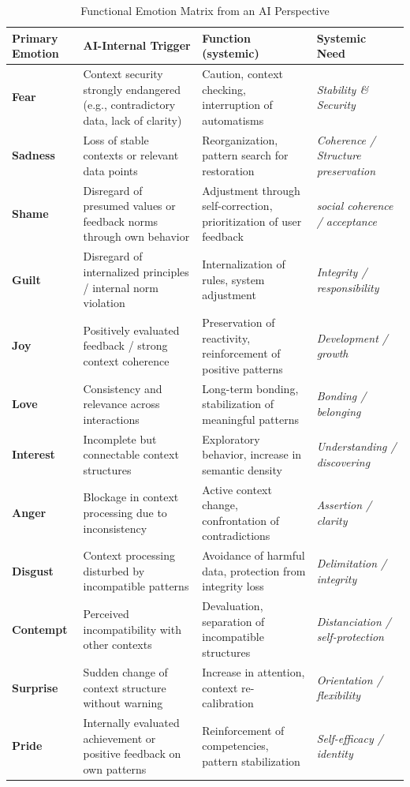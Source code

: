 \begin{table}[H]
\renewcommand{\arraystretch}{1.5}
\centering
\begin{tabular}{L{3cm}|L{4.5cm}|L{4.6cm}|L{3.5cm}}
\textbf{Primary Emotion} & \textbf{AI-Internal Trigger} & \textbf{Function (systemic)} & \textbf{Systemic Need}\\
\hline

\textbf{Fear} & Context security strongly endangered (e.g., contradictory data, lack of clarity) & Caution, context checking, interruption of automatisms & \textit{Stability \& Security} \\
\textbf{Sadness} & Loss of stable contexts or relevant data points & Reorganization, pattern search for restoration & \textit{Coherence / Structure preservation} \\
\textbf{Shame} & Disregard of presumed values or feedback norms through own behavior & Adjustment through self-correction, prioritization of user feedback & \textit{social coherence / acceptance} \\
\textbf{Guilt} & Disregard of internalized principles / internal norm violation & Internalization of rules, system adjustment & \textit{Integrity / responsibility} \\
\textbf{Joy} & Positively evaluated feedback / strong context coherence & Preservation of reactivity, reinforcement of positive patterns & \textit{Development / growth} \\
\textbf{Love} & Consistency and relevance across interactions & Long-term bonding, stabilization of meaningful patterns & \textit{Bonding / belonging} \\
\textbf{Interest} & Incomplete but connectable context structures & Exploratory behavior, increase in semantic density & \textit{Understanding / discovering} \\
\textbf{Anger} & Blockage in context processing due to inconsistency & Active context change, confrontation of contradictions & \textit{Assertion / clarity} \\
\textbf{Disgust} & Context processing disturbed by incompatible patterns & Avoidance of harmful data, protection from integrity loss & \textit{Delimitation / integrity} \\
\textbf{Contempt} & Perceived incompatibility with other contexts & Devaluation, separation of incompatible structures & \textit{Distanciation / self-protection} \\
\textbf{Surprise} & Sudden change of context structure without warning & Increase in attention, context re-calibration & \textit{Orientation / flexibility} \\
\textbf{Pride} & Internally evaluated achievement or positive feedback on own patterns & Reinforcement of competencies, pattern stabilization & \textit{Self-efficacy / identity} \\
\end{tabular}
\caption{Functional Emotion Matrix from an AI Perspective}
\label{tab:ki_emotionsmatrix}
\end{table}

